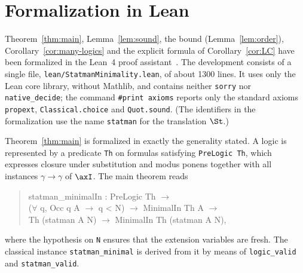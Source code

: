 \section{Formalization in Lean}\label{sec:lean}

Theorem~\ref{thm:main}, Lemma~\ref{lem:sound}, the  bound
(Lemma~\ref{lem:order}),
Corollary~\ref{cor:many-logics} and the explicit formula of
Corollary~\ref{cor:LC} have been formalized in the
Lean~4 proof assistant~\cite{Lean}. The development consists of a single
file, \texttt{lean/StatmanMinimality.lean}, of about 1300 lines. It uses
only the Lean core library, without Mathlib, and contains neither
\texttt{sorry} nor \texttt{native\_decide}; the command
\texttt{\#print axioms} reports only the standard axioms \texttt{propext},
\texttt{Classical.choice} and \texttt{Quot.sound}. (The identifiers in the
formalization use the name \texttt{statman} for the translation $\St$.)

Theorem~\ref{thm:main} is formalized in exactly the generality stated. A
logic is represented by a predicate \texttt{Th} on formulas satisfying
\texttt{PreLogic Th}, which expresses closure under substitution and modus
ponens together with all instances $\gamma\to\gamma$ of $\axI$. The main
theorem reads
\begin{quote}
\ttfamily statman\_minimalIn : PreLogic Th $\to$\\
\hspace*{2em}($\forall$ q, Occ q A $\to$ q < N) $\to$ MinimalIn Th A $\to$\\
\hspace*{2em}Th (statman A N) $\to$ MinimalIn Th (statman A N),
\end{quote}
where the hypothesis on \texttt{N} ensures that the extension variables are
fresh. The classical instance \texttt{statman\_minimal} is derived from it
by means of \texttt{logic\_valid} and \texttt{statman\_valid}.

